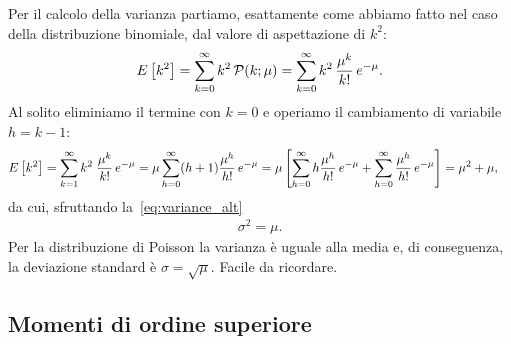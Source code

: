 Per il calcolo della varianza partiamo, esattamente come abbiamo fatto nel
caso della distribuzione binomiale, dal valore di aspettazione di $k^2$:
\begin{align*}
  \expect{k^2} = \sum_{k=0}^\infty k^2\,\poissonpdf[\mu]{k} =
  \sum_{k=0}^\infty k^2\,\frac{\mu^k}{k!}\,e^{-\mu}.
\end{align*}
Al solito eliminiamo il termine con $k = 0$ e operiamo il cambiamento
di variabile $h = k - 1$:
\begin{align*}
  \displaystyle E\left[k^2\right] & = \sum_{k=1}^\infty k^2\;\frac{\mu^k}{k!}\,e^{-\mu} =
  \mu \sum_{h=0}^\infty (h + 1)\frac{\mu^{h}}{h!}\,e^{-\mu} =
  \mu \left[ \sum_{h=0}^\infty h\frac{\mu^{h}}{h!}\,e^{-\mu}
    + \sum_{h=0}^\infty \frac{\mu^{h}}{h!}\,e^{-\mu} \right] = \mu^2 + \mu,
\end{align*}
da cui, sfruttando la~\eqref{eq:variance_alt}
\begin{align}\label{eq:poisson_variance}
  \sigma^2 = \mu.
\end{align}
Per la distribuzione di Poisson la varianza è uguale alla media e, di
conseguenza, la deviazione standard è $\sigma = \sqrt{\mu}$. Facile da
ricordare.


\subsection{Momenti di ordine superiore}

